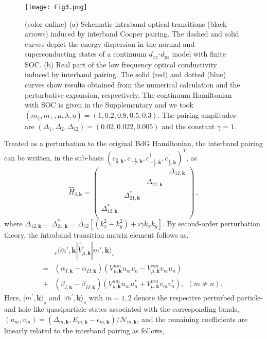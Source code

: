 \documentclass[prl,floatfix,twocolumn,showpacs,amsmath,superscriptaddress]{revtex4-2}
\renewcommand{\vec}[1]{\mathbf{#1}}
\newcommand{\vk}{{\vec{k}}}
\begin{document}
\begin{figure}
	\texttt{[image: Fig3.png]}
	\caption{(color online) (a) Schematic intraband optical transitions (black arrows) induced by interband Cooper pairing. The dashed and solid curves depict the energy dispersion in the normal and superconducting states of a continuum $d_{xz}$-$d_{yz}$ model with finite SOC. (b) Real part of the low frequency optical conductivity induced by interband pairing. The solid (red) and dotted (blue) curves show results obtained from the numerical calculation and the perturbative expansion, respectively. The continuum Hamiltonian with SOC is given in the Supplementary \cite{Supp} and we took $(m_\parallel, m_\perp, \mu, \lambda, \eta)=(1, 0.2, 0.8, 0.5, 0.3)$. The pairing amplitudes are $(\Delta_1, \Delta_2, \Delta_{12})=(0.02, 0.022, 0.005)$ and the constant $\gamma=1$.}
	\label{fig03}
\end{figure}
Treated as a perturbation to the original BdG Hamiltonian, the interband pairing can be written, in the sub-basis $(c_{\frac{3}{2},\vk},c_{-\frac{1}{2},\vk},c^\dagger_{-\frac{3}{2},\bar{\vk}},c^\dagger_{\frac{1}{2},\bar{\vk}})^T$, as~\cite{Supp}
\begin{equation}
	\hat{H}_{\delta,\vk}=\begin{pmatrix}
		&&&\Delta_{12,\vk} \\
		&&\Delta_{21,\vk} &\\
		&\Delta^*_{21,\vk} &&\\
		\Delta^*_{12,\vk} &&&\\
	\end{pmatrix}\,,
\end{equation}
where $\Delta_{12,\vk}=\Delta^*_{21,\vk}= \Delta_{12}[(k^2_x-k^2_y)+i \gamma k_xk_y]$. By second-order perturbation theory, the intraband transition matrix element follows as,
\begin{eqnarray}
	&&_s\langle \bar{m}',\vk |\hat{\widetilde{V}}_{\mu,\vk} |m',\vk\rangle_s\nonumber \\
	&=&(\alpha_{I,\vk}-\alpha_{II,\vk}  ) 
	(V^{nm}_{\mu,\vk}u_mv_n-V^{mn}_{\mu,\vk}v_mu_n) \nonumber \\
	&+&(\beta_{I,\vk}-\beta_{II,\vk}  )(V^{nm}_{\mu,\vk}u_mu_n^*+V^{mn}_{\mu,\vk}v_mv_n^*),~~(m\neq n).~~~~~
	\label{eq:intraTransition}
\end{eqnarray}
Here, $|m^\prime,\vk\rangle_s$ and $|\bar{m}^\prime,\vk\rangle_s$ with $m=1,2$ denote the respective perturbed particle- and hole-like quasiparticle states associated with the corresponding bands, $ (u_m,v_m)=(\Delta_{m,\vk},E_{m,\vk}-\epsilon_{m,\vk})/\mathcal{N}_{m,\vk}$, and the remaining coefficients are linearly related to the interband pairing as follows,
\end{document}
